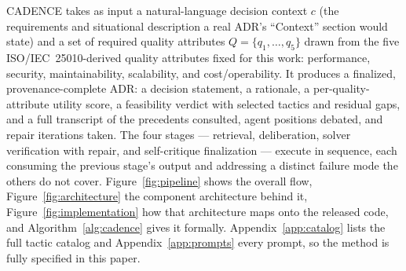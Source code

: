 \documentclass[preprint,12pt,authoryear]{elsarticle}
\renewcommand{\_}{\textunderscore\allowbreak{}}
\begin{document}
CADENCE takes as input a natural-language decision context $c$ (the requirements and situational description a real ADR's ``Context'' section would state) and a set of required quality attributes $Q = \{q_1, \ldots, q_5\}$ drawn from the five ISO/IEC~25010-derived quality attributes fixed for this work: performance, security, maintainability, scalability, and cost/operability. It produces a finalized, provenance-complete ADR: a decision statement, a rationale, a per-quality-attribute utility score, a feasibility verdict with selected tactics and residual gaps, and a full transcript of the precedents consulted, agent positions debated, and repair iterations taken. The four stages --- retrieval, deliberation, solver verification with repair, and self-critique finalization --- execute in sequence, each consuming the previous stage's output and addressing a distinct failure mode the others do not cover. Figure~\ref{fig:pipeline} shows the overall flow, Figure~\ref{fig:architecture} the component architecture behind it, Figure~\ref{fig:implementation} how that architecture maps onto the released code, and Algorithm~\ref{alg:cadence} gives it formally. Appendix~\ref{app:catalog} lists the full tactic catalog and Appendix~\ref{app:prompts} every prompt, so the method is fully specified in this paper.
\end{document}

